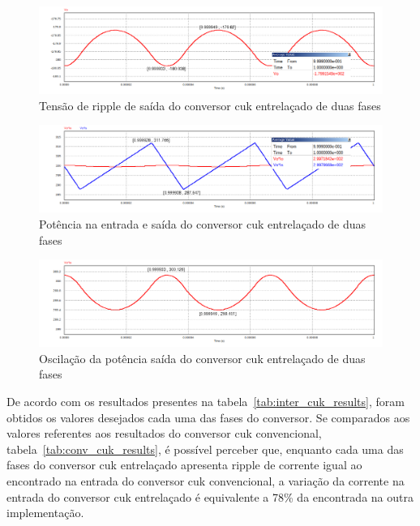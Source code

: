 \documentclass[
	12pt,				%
	openany,
	onseside,
	a4paper,			%
	english,			%
	french,				%
	spanish,			%
	brazil,				%
	]{abntex2}
\begin{document}
\begin{figure}[H]%
	\captionsetup{justification=centering}
	\centering
		\includegraphics[width= \linewidth]{cuk_inter_ripp_V_out}
		\caption{Tensão de ripple de saída do conversor cuk entrelaçado de duas fases}
		\label{fig:cuk_inter_ripp_V_out}
\end{figure}

\begin{figure}[H]%
	\captionsetup{justification=centering}
	\centering
		\includegraphics[width= \linewidth]{cuk_inter_power_sign}
		\caption{Potência na entrada e saída do conversor cuk entrelaçado de duas fases}
		\label{fig:cuk_inter_power_sign}
\end{figure}

\begin{figure}[H]%
	\captionsetup{justification=centering}
	\centering
		\includegraphics[width= \linewidth]{cuk_inter_pow_out}
		\caption{Oscilação da potência saída do conversor cuk entrelaçado de duas fases}
		\label{fig:cuk_inter_power_sign_out}
\end{figure}

De acordo com os resultados presentes na tabela~\ref{tab:inter_cuk_results}, foram obtidos os valores desejados cada uma das fases do conversor. Se comparados aos valores referentes aos resultados do conversor cuk convencional, tabela~\ref{tab:conv_cuk_results}, é possível perceber que, enquanto cada uma das fases do conversor cuk entrelaçado apresenta ripple de corrente igual ao encontrado na entrada do conversor cuk convencional, a variação da corrente na entrada do conversor cuk entrelaçado é equivalente a 78\% da encontrada na outra implementação.
\end{document}
